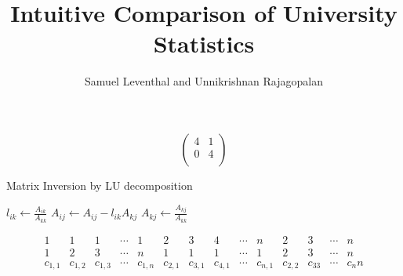 \documentclass[11pt, a4paper]{article}
\title{Intuitive Comparison of University Statistics
}
\author{Samuel Leventhal and Unnikrishnan Rajagopalan}
\date{}
\begin{document}
\maketitle





\iffalse

%
%
\begin{figure}[H]
\label{fig:prob1fig}
\end{figure}

%
%
\[ \begin{pmatrix}
  4 & 1 \\
  0 & 4 \\
\end{pmatrix}\]

%
%
  \begin{algorithm}[H]
\caption{Matrix Inversion by LU decomposition}
\begin{algorithmic}
              \State $l_{ik} \leftarrow \frac{A_{ik}}{A_{kk}}$ 
                        \State $A_{ij} \leftarrow A_{ij} - l_{ik}A_{kj}$ 
                    \EndFor
                    \EndIf
                    \State $A_{kj} \leftarrow \frac{A_{kj}}{A_{kk}}$ 
                    \EndFor
      \EndFor
  \EndFor
\end{algorithmic}
\end{algorithm}

%
%
  \[
  \begin{smallmatrix}
    1 & 1 & 1 & \cdots & 1 & 2 & 3 & 4 & \cdots & n & 2 & 3 & \cdots &n\\
    1 & 2 & 3 & \cdots & n & 1 & 1 & 1 & \cdots & 1 & 2 & 3 & \cdots & n\\
    c_{1,1} & c_{1,2} & c_{1,3} & \cdots & c_{1,n} & c_{2,1} & c_{3,1} & c_{4,1} & \cdots & c_{n,1} & c_{2,2} & c_33 &\cdots &c_nn\\
  \end{smallmatrix}
\]

%
%
\noindent{}
\end{document}
